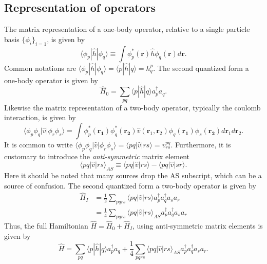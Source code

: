 \documentclass[a4paper,10pt]{article}
\newcommand{\braket}[1]{\langle#1\rangle}
\theoremstyle{definition}
\begin{document}
\subsection{Representation of operators}
The matrix representation of a one-body operator, relative to a single particle basis $\{ \phi_i \}_{i=1}$, is given by 
\begin{equation}
 \braket{\phi_p|\hat{h}|\phi_q} \equiv \int \phi^*_p(\mathbf{r}) \hat{h} \phi_q(\mathbf{r}) d\mathbf{r}.
\end{equation}
Common notations are $\braket{\phi_p|\hat{h}|\phi_q}=\braket{p|\hat{h}|q}=h^p_q$. The second quantized form a one-body operator 
is given by
\begin{equation}
 \hat{H}_0 = \sum_{pq}\braket{p|\hat{h}|q} a_p^\dagger a_q.
\end{equation}
Likewise the matrix representation of a two-body operator, typically the coulomb interaction, is given by 
\begin{equation}
 \braket{\phi_p \phi_q|\hat{v}|\phi_r \phi_s} = \int \phi^*_p(\mathbf{r_1}) \phi^*_q(\mathbf{r_2}) \hat{v}(\mathbf{r}_1,\mathbf{r}_2) \phi_q(\mathbf{r_1}) \phi_s(\mathbf{r_2}) d \mathbf{r}_1 d \mathbf{r}_2.
\end{equation}
It is common to write $\braket{\phi_p \phi_q|\hat{v}|\phi_r \phi_s} = \braket{pq|\hat{v}|rs} = v^{pq}_{rs}$. Furthermore, it is customary 
to introduce the \textit{anti-symmetric} matrix element
\begin{equation}
 \braket{pq|\hat{v}|rs}_{AS} \equiv \braket{pq|\hat{v}|rs} - \braket{pq|\hat{v}|sr}.
\end{equation}
Here it should be noted that many sources drop the AS subscript, which can be a source of confusion. The second quantized form a 
two-body operator is given by
\begin{align}
 \hat{H}_I &= \frac{1}{2} \sum_{pqrs} \braket{pq|\hat{v}|rs} a_p^\dagger a_q^\dagger a_s a_r \\
 &= \frac{1}{4}\sum_{pqrs} \braket{pq|\hat{v}|rs}_{AS} a_p^\dagger a_q^\dagger a_s a_r 
\end{align}
Thus, the full Hamiltonian $\hat{H} = \hat{H}_0 + \hat{H}_I$, using anti-symmetric matrix elements is given by 
\begin{equation}
 \hat{H} =  \sum_{pq}\braket{p|\hat{h}|q} a_p^\dagger a_q + \frac{1}{4}\sum_{pqrs} \braket{pq|\hat{v}|rs}_{AS} a_p^\dagger a_q^\dagger a_s a_r.
\end{equation}
\end{document}
